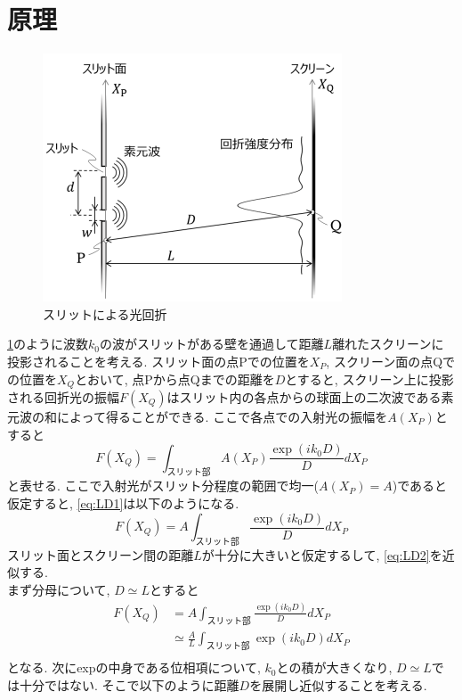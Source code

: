 \documentclass[11pt]{ltjsarticle}
\begin{document}
  \section*{原理}
    \begin{figure}[H]
      \centering
      \includegraphics[width=0.5\columnwidth]{LD_fig1.png}
      \caption{スリットによる光回折}
      \label{fig:slit}
    \end{figure}
    \cref{fig:slit}のように波数$k_0$の波がスリットがある壁を通過して距離$L$離れたスクリーンに投影されることを考える. 
    スリット面の点Pでの位置を$X_P$, スクリーン面の点Qでの位置を$X_Q$とおいて, 点Pから点Qまでの距離を$D$とすると, スクリーン上に投影される回折光の振幅$F(X_Q)$はスリット内の各点からの球面上の二次波である素元波の和によって得ることができる.
    ここで各点での入射光の振幅を$A(X_P)$とすると
    \begin{equation}
      F(X_Q) = \int_{\text{スリット部}}A(X_P) \frac{\exp(ik_0 D)}{D} dX_P
      \label{eq:LD1}
    \end{equation}
    と表せる. ここで入射光がスリット分程度の範囲で均一($A(X_P) = A$)であると仮定すると, \cref{eq:LD1}は以下のようになる. 
    \begin{equation}
      F(X_Q) = A\int_{\text{スリット部}} \frac{\exp(ik_0 D)}{D} dX_P
      \label{eq:LD2}
    \end{equation} 
    スリット面とスクリーン間の距離$L$が十分に大きいと仮定するして, \cref{eq:LD2}を近似する.\\
    まず分母について, $D\simeq L$とすると
    \begin{align*}
      F(X_Q) &= A\int_{\text{スリット部}} \frac{\exp(ik_0 D)}{D} dX_P\\
             &\simeq \frac{A}{L} \int_{\text{スリット部}} \exp(ik_0 D) dX_P\\
    \end{align*}
    となる. 次にexpの中身である位相項について, $k_0$との積が大きくなり, $D\simeq L$では十分ではない. そこで以下のように距離$D$を展開し近似することを考える.
\end{document}
